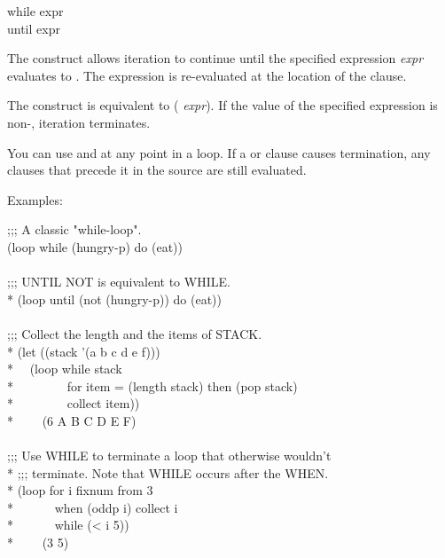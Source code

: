 \begin{defloop}
while expr \\
until expr

The  construct allows iteration to continue until the specified
expression \emph{expr} evaluates to .  The expression
is re-evaluated at the location of the  clause.

The  construct is equivalent to 
{ ( \emph{expr})}.  If the value of the
specified expression is non-, iteration terminates.

You can use  and  
at any point in a loop.  If a  or  clause causes
termination, any clauses that precede it in the source
are still evaluated.  

Examples:
\begin{lisp}
;;; A classic "while-loop". \\
(loop while (hungry-p) do (eat)) \\
 \\
;;; UNTIL NOT is equivalent to WHILE. \\*
(loop until (not (hungry-p)) do (eat)) \\
 \\
;;; Collect the length and the items of STACK. \\*
(let ((stack '(a b c d e f))) \\*
~~(loop while stack \\*
~~~~~~~~for item = (length stack) then (pop stack) \\*
~~~~~~~~collect item)) \\*
~~~\EV~(6 A B C D E F) \\
 \\
;;; Use WHILE to terminate a loop that otherwise wouldn't \\*
;;; terminate.  Note that WHILE occurs after the WHEN. \\*
(loop for i fixnum from 3 \\*
~~~~~~when (oddp i) collect i \\*
~~~~~~while (< i 5)) \\*
~~~\EV~(3 5)
\end{lisp}
\end{defloop}


